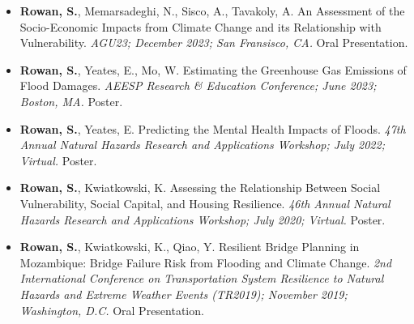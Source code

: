 \documentclass[11pt,a4paper,]{sr-awesome-cv}
\begin{document}
\begin{itemize}
\item
  \textbf{Rowan, S.}, Memarsadeghi, N., Sisco, A., Tavakoly, A. An
  Assessment of the Socio-Economic Impacts from Climate Change and its
  Relationship with Vulnerability. \emph{AGU23; December 2023; San
  Fransisco, CA.} Oral Presentation.
\item
  \textbf{Rowan, S.}, Yeates, E., Mo, W. Estimating the Greenhouse Gas
  Emissions of Flood Damages. \emph{AEESP Research \& Education
  Conference; June 2023; Boston, MA.} Poster.
\item
  \textbf{Rowan, S.}, Yeates, E. Predicting the Mental Health Impacts of
  Floods. \emph{47th Annual Natural Hazards Research and Applications
  Workshop; July 2022; Virtual.} Poster.
\item
  \textbf{Rowan, S.}, Kwiatkowski, K. Assessing the Relationship Between
  Social Vulnerability, Social Capital, and Housing Resilience.
  \emph{46th Annual Natural Hazards Research and Applications Workshop;
  July 2020; Virtual.} Poster.
\item
  \textbf{Rowan, S.}, Kwiatkowski, K., Qiao, Y. Resilient Bridge
  Planning in Mozambique: Bridge Failure Risk from Flooding and Climate
  Change. \emph{2nd International Conference on Transportation System
  Resilience to Natural Hazards and Extreme Weather Events (TR2019);
  November 2019; Washington, D.C.} Oral Presentation.
\end{itemize}

\normalsize
\end{document}
